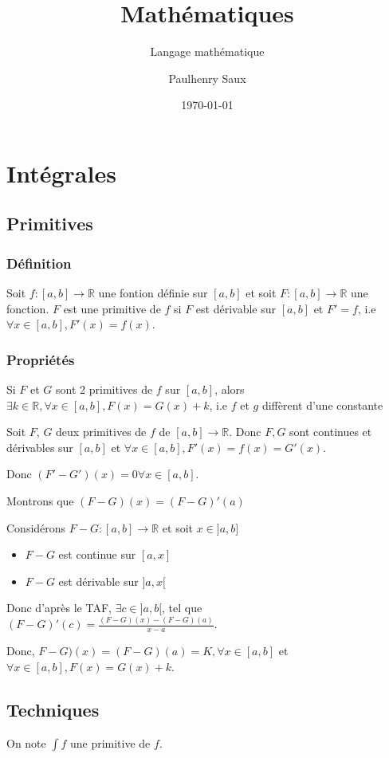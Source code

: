 \documentclass[french]{yLectureNote}
\title{Mathématiques}
\subtitle{Langage mathématique}
\author{Paulhenry Saux}
\date{\today}
\begin{document}
\setcounter{chapter}{3}

	\chapter{Intégrales}
\section{Primitives}

\subsection{Définition}
Soit $f: [a,b] \to \mathbb{R}$ une fontion définie sur $[a,b]$ et soit $F : [a,b] \to \mathbb{R}$ une fonction. $F$ est une primitive de $f$ si $F$ est dérivable sur $[a,b]$ et $F' = f$, i.e $\forall x\in[a,b], F'(x) = f(x)$.

\subsection{Propriétés}
Si $F$ et $G$ sont 2 primitives de $f$ sur $[a,b]$, alors $\exists k\in\mathbb{R},\forall x\in[a,b],F(x) = G(x)+k$, i.e $f$ et $g$ diffèrent d'une constante

\begin{myproof}
Soit $F$, $G$ deux primitives de $f$ de $[a,b]\to \mathbb{R}$. Donc $F,G$ sont continues et dérivables sur $[a,b]$ et $\forall x\in[a,b], F'(x) = f(x) = G'(x)$.

Donc $(F'-G')(x) = 0 \forall x\in[a,b]$.

Montrons que $(F-G)(x) = (F-G)'(a)$

Considérons $F-G : [a,b] \to \mathbb{R}$ et soit $x\in]a,b]$
\begin{itemize}
 \item $F-G$ est continue sur $[a,x]$
 \item $F-G$ est dérivable sur $]a,x[$
\end{itemize}
Donc d'après le TAF, $\exists c\in]a,b[$, tel que $(F-G)'(c) = \frac{(F-G)(x)-(F-G)(a)}{x-a}$.

Donc, $F-G)(x) = (F-G)(a) = K,\forall x\in[a,b]$ et $\forall x\in[a,b],F(x) = G(x)+k$.
\end{myproof}
\section{Techniques}
On note $\int f$ une primitive de $f$.
\end{document}

